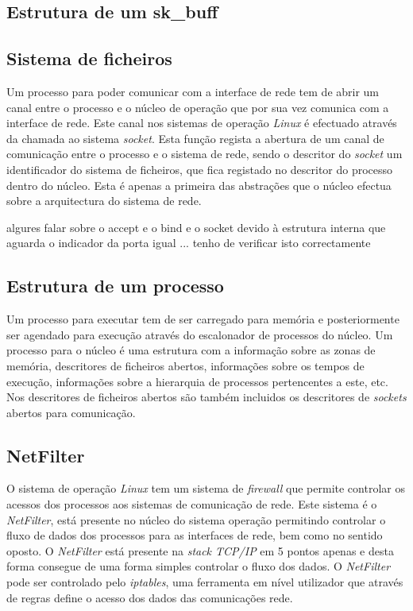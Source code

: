 \subsection{Estrutura de um sk\_buff}

\subsection{Sistema de ficheiros}

Um processo para poder comunicar com a interface de rede tem de abrir um canal entre o processo e o núcleo de operação que por sua vez comunica com a interface de rede.
 Este canal nos sistemas de operação \textit{Linux} é efectuado através da chamada ao sistema \textit{socket}.
 Esta função regista a abertura de um canal de comunicação entre o processo e o sistema de rede, sendo o descritor do \textit{socket} um identificador do sistema de ficheiros, que fica registado no descritor do processo dentro do núcleo.
 Esta é apenas a primeira das abstrações que o núcleo efectua sobre a arquitectura do sistema de rede.
  
algures falar sobre o accept e o bind e o socket devido à estrutura interna que aguarda o indicador da porta igual ... tenho de verificar isto correctamente
 

\subsection{Estrutura de um processo}

Um processo para executar tem de ser carregado para memória e posteriormente ser agendado para execução através do escalonador de processos do núcleo.
 Um processo para o núcleo é uma estrutura com a informação sobre as zonas de memória, descritores de ficheiros abertos, informações sobre os tempos de execução, informações sobre a hierarquia de processos pertencentes a este, etc. Nos descritores de ficheiros abertos são também incluidos os descritores de \textit{sockets} abertos para comunicação. 

\subsection{NetFilter}

O sistema de operação \textit{Linux} tem um sistema de \textit{firewall} que permite controlar os acessos dos processos aos sistemas de comunicação de rede.
 Este sistema é o \textit{NetFilter}, está presente no núcleo do sistema operação permitindo controlar o fluxo de dados dos processos para as interfaces de rede, bem como no sentido oposto. O \textit{NetFilter} está presente na \textit{stack TCP/IP} em 5 pontos apenas e desta forma consegue de uma forma simples controlar o fluxo dos dados. O \textit{NetFilter} pode ser controlado pelo \textit{iptables}, uma ferramenta em nível utilizador que através de regras define o acesso dos dados das comunicações rede.

